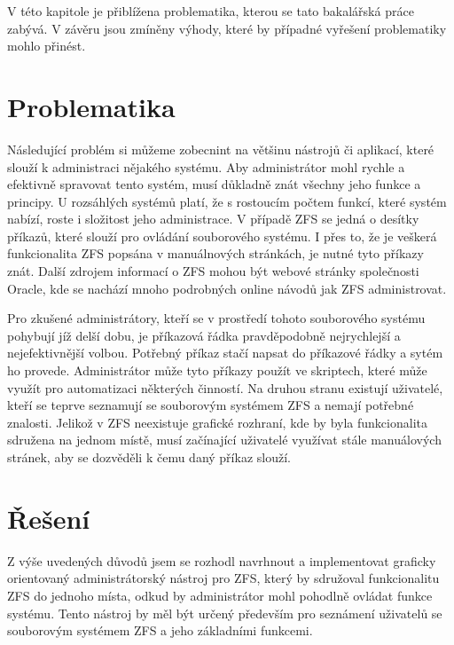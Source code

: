 V této kapitole je přiblížena problematika, kterou se tato bakalářská práce zabývá. V závěru jsou zmíněny výhody, které by případné vyřešení problematiky mohlo přinést.

\section{Problematika}
Následující problém si můžeme zobecnint na většinu nástrojů či aplikací, které slouží k administraci nějakého systému.
Aby administrátor mohl rychle a efektivně spravovat tento systém, musí důkladně znát všechny jeho funkce a principy. U rozsáhlých systémů platí, že s rostoucím počtem funkcí, které systém nabízí, roste i složitost jeho administrace. V případě ZFS se jedná o desítky příkazů, které slouží pro ovládání souborového systému. I přes to, že je veškerá funkcionalita ZFS popsána v manuálnových stránkách, je nutné tyto příkazy znát.
Další zdrojem informací o ZFS mohou být webové stránky společnosti Oracle, kde se nachází mnoho
podrobných online návodů jak ZFS administrovat.

Pro zkušené administrátory, kteří se v prostředí tohoto souborového systému pohybují jíž delší dobu, je příkazová řádka pravděpodobně nejrychlejší a nejefektivnější volbou. Potřebný příkaz stačí napsat do příkazové řádky a sytém ho provede. Administrátor může tyto příkazy použít ve skriptech, které může využít pro automatizaci některých činností. Na druhou stranu existují uživatelé, kteří se teprve seznamují se souborovým systémem ZFS a nemají potřebné znalosti. Jelikož v ZFS neexistuje grafické rozhraní, kde by byla funkcionalita sdružena na jednom místě, musí začínající uživatelé využívat stále manuálových stránek, aby se dozvěděli k čemu daný příkaz slouží.
\section{Řešení}
Z výše uvedených důvodů jsem se rozhodl navrhnout a implementovat graficky orientovaný administrátorský nástroj pro ZFS, který by sdružoval funkcionalitu ZFS do jednoho místa, odkud by administrátor mohl pohodlně ovládat funkce systému. Tento nástroj by měl být určený především pro seznámení uživatelů se souborovým systémem ZFS a jeho základními funkcemi.

